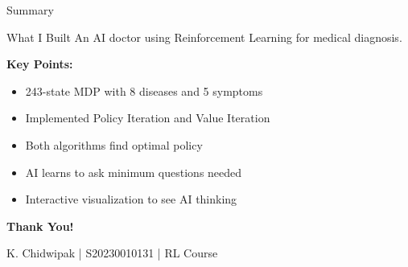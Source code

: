 \documentclass[aspectratio=169]{beamer}
\begin{document}
\begin{frame}{Summary}
    \begin{block}{What I Built}
        An AI doctor using Reinforcement Learning for medical diagnosis.
    \end{block}
    
    \vspace{0.3cm}
    
    \textbf{Key Points:}
    \begin{itemize}
        \item 243-state MDP with 8 diseases and 5 symptoms
        \item Implemented Policy Iteration and Value Iteration
        \item Both algorithms find optimal policy
        \item AI learns to ask minimum questions needed
        \item Interactive visualization to see AI thinking
    \end{itemize}
    
    \vspace{0.3cm}
    
    \begin{center}
        \textbf{Thank You!}
        
        \vspace{0.2cm}
        
        K. Chidwipak | S20230010131 | RL Course
    \end{center}
\end{frame}
\end{document}
